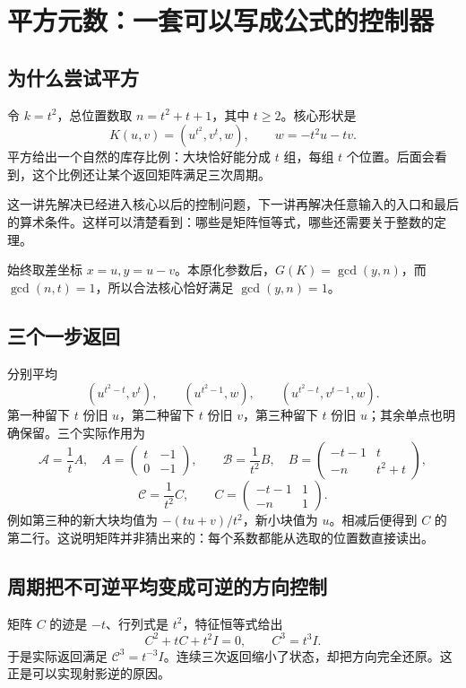 \chapter{平方元数：一套可以写成公式的控制器}\label{ch:square}
\section{为什么尝试平方}
令 $k=t^2$，总位置数取 $n=t^2+t+1$，其中 $t\ge2$。核心形状是
\[K(u,v)=(u^{t^2},v^t,w),\qquad w=-t^2u-tv.
\]
平方给出一个自然的库存比例：大块恰好能分成 $t$ 组，每组 $t$ 个位置。后面会看到，这个比例还让某个返回矩阵满足三次周期。

这一讲先解决已经进入核心以后的控制问题，下一讲再解决任意输入的入口和最后的算术条件。这样可以清楚看到：哪些是矩阵恒等式，哪些还需要关于整数的定理。

始终取差坐标 $x=u,y=u-v$。本原化参数后，$G(K)=\gcd(y,n)$，而 $\gcd(n,t)=1$，所以合法核心恰好满足 $\gcd(y,n)=1$。

\section{三个一步返回}
分别平均
\[(u^{t^2-t},v^t),\qquad(u^{t^2-1},w),\qquad
(u^{t^2-t},v^{t-1},w).
\]
第一种留下 $t$ 份旧 $u$，第二种留下 $t$ 份旧 $v$，第三种留下 $t$ 份旧 $u$；其余单点也明确保留。三个实际作用为
\[
\mathcal A=\frac1t A,\quad A=\begin{pmatrix}t&-1\\0&-1\end{pmatrix},\qquad
\mathcal B=\frac1{t^2}B,\quad B=\begin{pmatrix}-t-1&t\\-n&t^2+t\end{pmatrix},
\]
\[
\mathcal C=\frac1{t^2}C,\qquad C=\begin{pmatrix}-t-1&1\\-n&1\end{pmatrix}.
\]
例如第三种的新大块均值为 $-(tu+v)/t^2$，新小块值为 $u$。相减后便得到 $C$ 的第二行。这说明矩阵并非猜出来的：每个系数都能从选取的位置数直接读出。

\section{周期把不可逆平均变成可逆的方向控制}
矩阵 $C$ 的迹是 $-t$、行列式是 $t^2$，特征恒等式给出
\[C^2+tC+t^2I=0,\qquad C^3=t^3I.
\]
于是实际返回满足 $\mathcal C^3=t^{-3}I$。连续三次返回缩小了状态，却把方向完全还原。这正是可以实现射影逆的原因。

